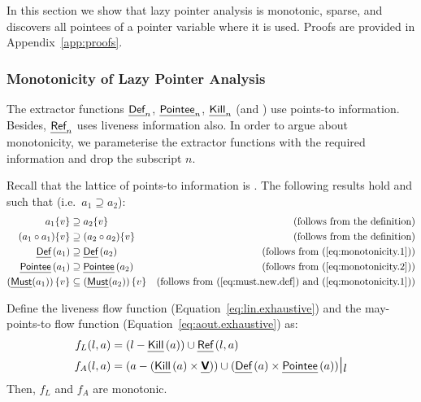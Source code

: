 \documentclass{llncs}
\newcommand{\var}{\text{\sf\bfseries\em V}\xspace}
\newcommand{\pointer}{\text{\sf\bfseries\em P}\xspace}
\newcommand{\aptE}{\text{$\mathcal{A}$}\xspace}
\newcommand{\lvE}{\text{$\mathcal{L}$}\xspace}
\newcommand{\must}{\text{\sf\em Must\/}\xspace}
\newcommand{\Def}{\text{{\sf\em Def}}\xspace}
\newcommand{\Pointee}{\text{{\sf\em Pointee}}\xspace}
\newcommand{\Kill}{\text{{\sf\em Kill}}\xspace}
\newcommand{\Ref}{\text{{\sf\em Ref}}\xspace} \newcommand{\sRef}{\text{{\sf\em sRef}}\xspace}
\newcommand{\bigrestrict}[2]{\text{$\protect#1\!\mbox{\Large$\mid_{\protect#2}$}$}}
\begin{document}
In this section we show that lazy pointer analysis is monotonic,
sparse, and discovers all pointees of a pointer variable where 
it is used.
Proofs are provided in Appendix~\ref{app:proofs}. 

\subsubsection{Monotonicity of Lazy Pointer Analysis}
\label{sec:monotonicity}
The extractor functions $\Def_n$, $\Pointee_n$, $\Kill_n$ (and \must)
use points-to
information. Besides, $\Ref_n$ uses liveness information also. In order
to argue about monotonicity, we parameterise the extractor functions
with the required information and drop the subscript $n$.


Recall that the lattice of points-to information is \text{$\aptE =
\left\langle\mathcal{P}(\pointer\times\var), \supseteq\right\rangle$}.
The following
results hold \text{$\forall v \in \var$} and \text{$\forall a_1, a_2 \in
\aptE$} such that  (i.e.\ $a_1 \supseteq a_2$):
\begin{align}
  a_1\{v\} & \supseteq a_2\{v\}
	& \text{(follows from the definition)}
	\label{eq:monotonicity.1}
	\\
  (a_1\circ a_1)\{v\} & \supseteq (a_2\circ a_2)\{v\}
	& \text{(follows from the definition)}
	\label{eq:monotonicity.2}
	\\
  \Def\,(a_1) & \supseteq \Def\,(a_2)
	& \text{(follows from~(\ref{eq:monotonicity.1}))}
	\label{eq:monotonicity.3}
	\\
  \Pointee\,(a_1) & \supseteq \Pointee\,(a_2)
	& \text{(follows from~(\ref{eq:monotonicity.2}))}
	\label{eq:monotonicity.4}
	\\
  \left(\must(a_1)\right)\{v\} & \subseteq 
				\left(\must(a_2)\right)\{v\} 
	& \text{(follows from~(\ref{eq:must.new.def}) and~(\ref{eq:monotonicity.1}))}
	\label{eq:monotonicity.5}
\end{align}



\begin{theorem}
Define the liveness flow function \text{$f_L : \lvE\times\aptE
\mapsto \lvE$} (Equation~\ref{eq:lin.exhaustive}) and the may-points-to
flow function \text{$f_A : \lvE\times\aptE \mapsto \aptE$}
(Equation~\ref{eq:aout.exhaustive}) as:
\begin{align*}
f_L (l,a) & = (l - \Kill\,(a)) \cup \Ref\,(l,a)
\\
f_A (l,a) & = \bigrestrict{\left(a - (\Kill\,(a)\times \var)\right) 
	\cup \left(\Def\,(a)\times\Pointee\,(a)\right)}{l}
\end{align*}
Then, $f_L$ and $f_A$ are monotonic.
\end{theorem}
\end{document}
